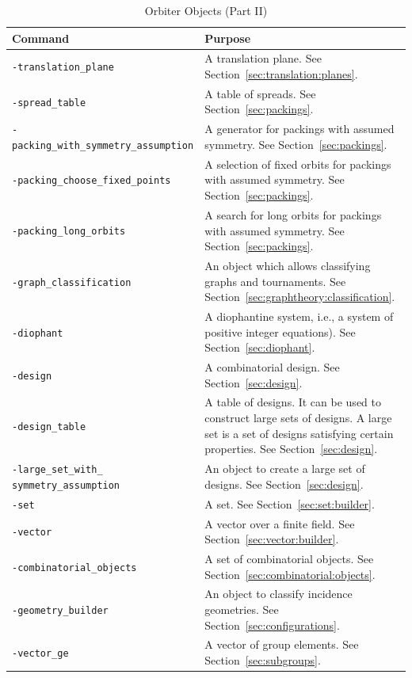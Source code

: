 \begin{table}
	\begin{center}
	\begin{tabular}{|p{7cm}|p{7cm}|}
		\hline
		Command  & Purpose \\
		\hline
		\hline
		\verb'-translation_plane' &     A translation plane. See Section~\ref{sec:translation:planes}.\\
		\hline
		\verb'-spread_table' &     A table of spreads. See Section~\ref{sec:packings}.\\
		\hline
		\verb'-packing_with_symmetry_assumption' &     A generator for packings with assumed symmetry. See Section~\ref{sec:packings}.\\
		\hline
		\verb'-packing_choose_fixed_points' &     A selection of fixed orbits for packings with assumed symmetry. See Section~\ref{sec:packings}.\\
		\hline
		\verb'-packing_long_orbits' &     A search for long orbits for packings with assumed symmetry. See Section~\ref{sec:packings}.\\
		\hline
		\verb'-graph_classification' &     An object which allows classifying graphs and tournaments. See Section~\ref{sec:graphtheory:classification}. \\
		\hline
		\verb'-diophant' &     A diophantine system, i.e., a system of positive integer equations). See Section~\ref{sec:diophant}. \\
		\hline
		\verb'-design' &     A combinatorial design. See Section~\ref{sec:design}. \\
		\hline
		\verb'-design_table' &     A table of designs. It can be used to construct large sets of designs. A large set is a set of designs satisfying certain properties. See Section~\ref{sec:design}. \\
		\hline
		\verb'-large_set_with_' \verb'symmetry_assumption' &     An object to create a large set of designs. See Section~\ref{sec:design}. \\
		\hline
		\verb'-set' &     A set. See Section~\ref{sec:set:builder}. \\
		\hline
		\verb'-vector' &     A vector over a finite field. See Section~\ref{sec:vector:builder}. \\
		\hline
		\verb'-combinatorial_objects' &     A set of combinatorial objects. See Section~\ref{sec:combinatorial:objects}. \\
		\hline
		\verb'-geometry_builder' &     An object to classify incidence geometries. See Section~\ref{sec:configurations}. \\
		\hline
		\verb'-vector_ge' &     A vector of group elements. See Section~\ref{sec:subgroups}. \\
		\hline
		\end{tabular}
	\end{center}
	\caption{\label{tab:define:2}Orbiter Objects (Part II)}
\end{table}
